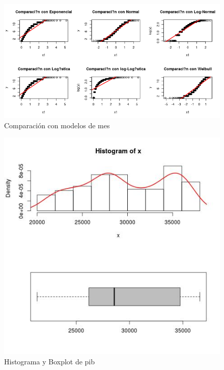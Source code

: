 \documentclass{article}
\begin{document}
\begin{figure}[h!]
\centering
\includegraphics[scale=0.5]{./plots/cm_mes.png}
\caption{Comparación con modelos de mes}
\end{figure}
\pagebreak
\begin{figure}[h!]
\centering
\includegraphics[scale=0.5]{./plots/histplot_pib.png}
\caption{Histograma y Boxplot de pib}
\end{figure}
\end{document}
